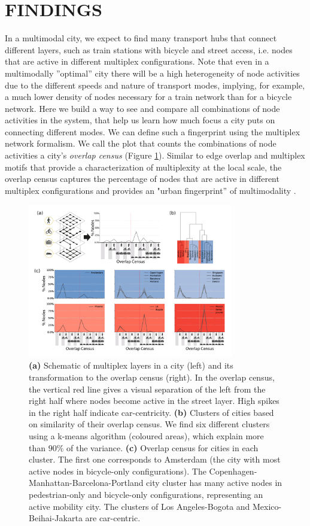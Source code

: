 \section{FINDINGS}
In a multimodal city, we expect to find many transport hubs that connect different layers, such as train stations with bicycle and street access, i.e. nodes that are active in different multiplex configurations. Note that even in a multimodally ''optimal'' city there will be a high heterogeneity of node activities due to the different speeds and nature of transport modes, implying, for example, a much lower density of nodes necessary for a train network than for a bicycle network. Here we build a way to see and compare all combinations of node activities in the system, that help us learn how much focus a city puts on connecting different modes. We can define such a fingerprint using the multiplex network formalism. We call the plot that counts the combinations of node activities a city's \emph{overlap census} (Figure \ref{fig:fig02}). Similar to edge overlap \cite{Bianconi2013,Battiston2014a} and multiplex motifs \cite{Battiston2017} that provide a characterization of multiplexity at the local scale, the overlap census captures the percentage of nodes that are active in different multiplex configurations and provides an "urban fingerprint'' of multimodality \cite{Aleta2017}.

\begin{figure}[t!]
	\centering
	\includegraphics[width=0.8\textwidth]{images/multiplex/Fig02.png}
	\caption{
		\textbf{(a)} Schematic of multiplex layers in a city (left) and its transformation to the overlap census (right). In the overlap census, the vertical red line gives a visual separation of the left from the right half where nodes become active in the street layer. High spikes in the right half indicate car-centricity.
		 \textbf{(b)} Clusters of cities based on similarity of their overlap census. We find six different clusters using a k-means algorithm (coloured areas), which explain more than $90\%$ of the variance.
		 \textbf{(c)} Overlap census for cities in each cluster. The first one corresponds to Amsterdam (the city with most active nodes in bicycle-only configurations). The Copenhagen-Manhattan-Barcelona-Portland city cluster has many active nodes in pedestrian-only and bicycle-only configurations, representing an active mobility city. The clusters of Los Angeles-Bogota and Mexico-Beihai-Jakarta are car-centric.}
	\label{fig:fig02}
\end{figure}

